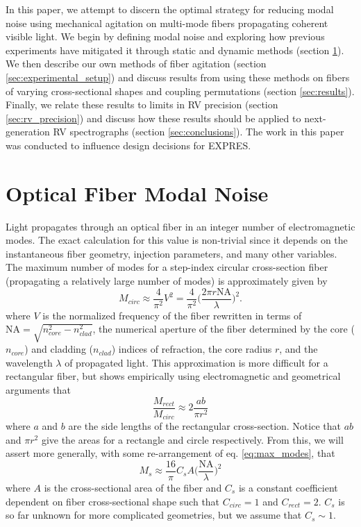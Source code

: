 \documentclass[twocolumn]{emulateapj}
\begin{document}
In this paper, we attempt to discern the optimal strategy for reducing modal noise using mechanical agitation on multi-mode fibers propagating coherent visible light. We begin by defining modal noise and exploring how previous experiments have mitigated it through static and dynamic methods (section \ref{sec:modal_noise_intro}). We then describe our own methods of fiber agitation (section \ref{sec:experimental_setup}) and discuss results from using these methods on fibers of varying cross-sectional shapes and coupling permutations (section \ref{sec:results}). Finally, we relate these results to limits in RV precision (section \ref{sec:rv_precision}) and discuss how these results should be applied to next-generation RV spectrographs (section \ref{sec:conclusions}). The work in this paper was conducted to influence design decisions for EXPRES.

\section{Optical Fiber Modal Noise}
\label{sec:modal_noise_intro}

Light propagates through an optical fiber in an integer number of electromagnetic modes. The exact calculation for this value is non-trivial since it depends on the instantaneous fiber geometry, injection parameters, and many other variables. The maximum number of modes for a step-index circular cross-section fiber (propagating a relatively large number of modes) is approximately given by
\begin{equation}
M_{circ} \approx \frac{4}{\pi ^2} V^2 = \frac{4}{\pi ^2} \Bigg( \frac{2 \pi r \mathrm{NA}}{\lambda} \Bigg) ^2.
\label{eq:max_modes}
\end{equation}
where $V$ is the normalized frequency of the fiber rewritten in terms of $\mathrm{NA} = \sqrt{n_{core}^2 - n_{clad}^2}$, the numerical aperture of the fiber determined by the core ($n_{core}$) and cladding ($n_{clad}$) indices of refraction, the core radius $r$, and the wavelength $\lambda$ of propagated light. This approximation is more difficult for a rectangular fiber, but \citet{Nikitin2011} shows empirically using electromagnetic and geometrical arguments that
\begin{equation}
\frac{M_{rect}}{M_{circ}} \approx 2 \frac{ab}{\pi r^2}
\label{eq:prop_modes}
\end{equation}
where $a$ and $b$ are the side lengths of the rectangular cross-section. Notice that $ab$ and $\pi r^2$ give the areas for a rectangle and circle respectively. From this, we will assert more generally, with some re-arrangement of eq. \ref{eq:max_modes}, that
\begin{equation}
M_{s} \approx \frac{16}{\pi} C_{s} A \Bigg( \frac{\mathrm{NA}}{\lambda} \Bigg) ^2
\label{eq:mode_area}
\end{equation}
where $A$ is the cross-sectional area of the fiber and $C_{s}$ is a constant coefficient dependent on fiber cross-sectional shape such that $C_{circ} = 1$ and $C_{rect} = 2$. $C_{s}$ is so far unknown for more complicated geometries, but we assume that $C_{s} \sim 1$.
\end{document}
